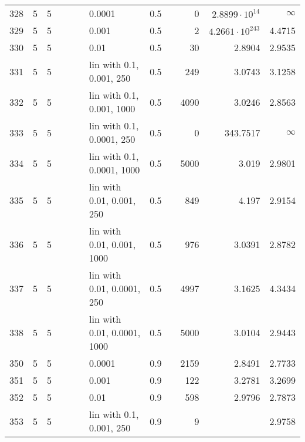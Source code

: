 \begin{longtable}{lrrrrrlrrrrr}
  328 &       5 & 5 &   &   &   &                      0.0001 &      0.5 &        &       0 &  $2.8899\cdot 10^{14}$ &               $\infty$ \\
  329 &       5 & 5 &   &   &   &                       0.001 &      0.5 &        &       2 & $4.2661\cdot 10^{243}$ &                 4.4715 \\
  330 &       5 & 5 &   &   &   &                        0.01 &      0.5 &        &      30 &                 2.8904 &                 2.9535 \\
  331 &       5 & 5 &   &   &   &    lin with 0.1, 0.001, 250 &      0.5 &        &     249 &                 3.0743 &                 3.1258 \\
  332 &       5 & 5 &   &   &   &   lin with 0.1, 0.001, 1000 &      0.5 &        &    4090 &                 3.0246 &                 2.8563 \\
  333 &       5 & 5 &   &   &   &   lin with 0.1, 0.0001, 250 &      0.5 &        &       0 &               343.7517 &               $\infty$ \\
  334 &       5 & 5 &   &   &   &  lin with 0.1, 0.0001, 1000 &      0.5 &        &    5000 &                  3.019 &                 2.9801 \\
  335 &       5 & 5 &   &   &   &   lin with 0.01, 0.001, 250 &      0.5 &        &     849 &                  4.197 &                 2.9154 \\
  336 &       5 & 5 &   &   &   &  lin with 0.01, 0.001, 1000 &      0.5 &        &     976 &                 3.0391 &                 2.8782 \\
  337 &       5 & 5 &   &   &   &  lin with 0.01, 0.0001, 250 &      0.5 &        &    4997 &                 3.1625 &                 4.3434 \\
  338 &       5 & 5 &   &   &   & lin with 0.01, 0.0001, 1000 &      0.5 &        &    5000 &                 3.0104 &                 2.9443 \\
  350 &       5 & 5 &   &   &   &                      0.0001 &      0.9 &        &    2159 &                 2.8491 &                 2.7733 \\
  351 &       5 & 5 &   &   &   &                       0.001 &      0.9 &        &     122 &                 3.2781 &                 3.2699 \\
  352 &       5 & 5 &   &   &   &                        0.01 &      0.9 &        &     598 &                 2.9796 &                 2.7873 \\
  353 &       5 & 5 &   &   &   &    lin with 0.1, 0.001, 250 &      0.9 &        &       9 &                        &                 2.9758 \\

\end{longtable}

